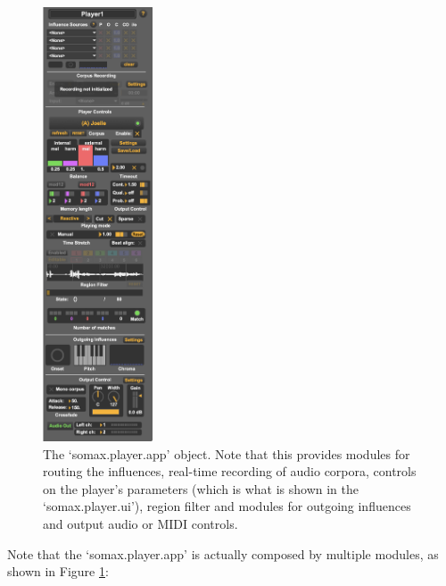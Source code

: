  \begin{figure}[H]
    \centering        
 	\includegraphics[width=0.29\textwidth, keepaspectratio]{somax2-6-user-guide/img/player_app_audio_2-6.png}
    \caption{The `somax.player.app' object. Note that this provides modules for routing the influences, real-time recording of audio corpora, controls on the player's parameters (which is what is shown in the `somax.player.ui'), region filter and modules for outgoing influences and output audio or MIDI controls.}
    \label{fig:player_app}
\end{figure}

Note that the `somax.player.app' is actually composed by multiple modules, as shown in Figure \ref{fig:player_app}:

